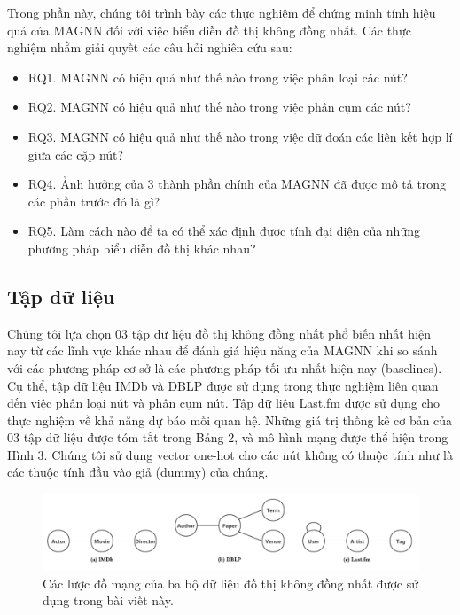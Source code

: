 Trong phần này, chúng tôi trình bày các thực nghiệm để chứng minh tính hiệu quả của MAGNN đối với việc biểu diễn đồ thị không đồng nhất. Các thực nghiệm nhằm giải quyết các câu hỏi nghiên cứu sau:

\begin{itemize}
  \item RQ1. MAGNN có hiệu quả như thế nào trong việc phân loại các nút?
  \item RQ2. MAGNN có hiệu quả như thế nào trong việc phân cụm các nút?
  \item RQ3. MAGNN có hiệu quả như thế nào trong việc dữ đoán các liên kết hợp lí giữa các cặp nút?
  \item RQ4. Ảnh hưởng của 3 thành phần chính của MAGNN đã được mô tả trong các phần trước đó là gì?
  \item RQ5. Làm cách nào để ta có thể xác định được tính đại diện của những phương pháp biểu diễn đồ thị khác nhau?
\end{itemize}

\subsection{Tập dữ liệu}
Chúng tôi lựa chọn 03 tập dữ liệu đồ thị không đồng nhất phổ biến nhất hiện nay từ các lĩnh vực khác nhau để đánh giá hiệu năng của MAGNN khi so sánh với các phương pháp cơ sở là các phương pháp tối ưu nhất hiện nay (baselines). Cụ thể, tập dữ liệu IMDb và DBLP được sử dụng trong thực nghiệm liên quan đến việc phân loại nút và phân cụm nút. Tập dữ liệu Last.fm được sử dụng cho thực nghiệm về khả năng dự báo mối quan hệ. Những giá trị thống kê cơ bản của 03 tập dữ liệu được tóm tắt trong Bảng 2, và mô hình mạng được thể hiện trong Hình 3. Chúng tôi sử dụng vector one-hot cho các nút không có thuộc tính như là các thuộc tính đầu vào giả (dummy) của chúng. 

\begin{figure}
  \includegraphics[width=\textwidth]{figs/fig3.png}
  \caption{Các lược đồ mạng của ba bộ dữ liệu đồ thị không đồng nhất được sử dụng trong bài viết này.}
\end{figure}

